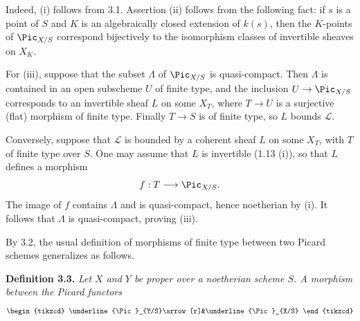 Indeed, (i) follows from 3.1. Assertion (ii) follows from the following
fact: if \(s\) is a point of \(S\) and \(K\) is an algebraically closed
extension of \(k(s)\), then the \(K\)-points of \(\Pic_{X/S}\) correspond
bijectively to the isomorphism classes of invertible sheaves on \(X_K\).

For (iii), suppose that the subset \(\Lambda\) of \(\Pic_{X/S}\) is
quasi-compact. Then \(\Lambda\) is contained in an open subscheme \(U\)
of finite type, and the inclusion \(U\to\Pic_{X/S}\) corresponds to an
invertible sheaf \(L\) on some \(X_T\), where \(T\to U\) is a surjective
(flat) morphism of finite type. Finally \(T\to S\) is of finite type, so
\(L\) bounds \(\mathscr L\).

Conversely, suppose that \(\mathscr L\) is bounded by a coherent sheaf
\(L\) on some \(X_T\), with \(T\) of finite type over \(S\). One may
assume that \(L\) is invertible (1.13 (i)), so that \(L\) defines a
morphism
\[
f:T\longrightarrow\Pic_{X/S}.
\]
The image of \(f\) contains \(\Lambda\) and is quasi-compact, hence
noetherian by (i). It follows that \(\Lambda\) is quasi-compact, proving
(iii).

By 3.2, the usual definition of morphisms of finite type between two
Picard schemes generalizes as follows.

\textbf{Definition 3.3.} \emph{Let \(X\) and \(Y\) be proper over a
noetherian scheme \(S\). A morphism between the Picard functors}
\[
\begin{tikzcd}
\underline{\Pic}_{Y/S}\arrow[r]&\underline{\Pic}_{X/S}
\end{tikzcd}
\]

